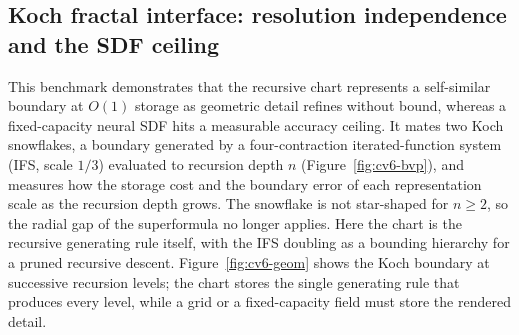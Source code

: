 \documentclass{svjour3}                 %
\begin{document}
\subsection{Koch fractal interface: resolution independence and the SDF ceiling}\label{sec:verif_cv6}

This benchmark demonstrates that the recursive chart represents a self-similar boundary at $O(1)$ storage as
geometric detail refines without bound, whereas a fixed-capacity neural SDF hits a measurable accuracy ceiling.
It mates two Koch snowflakes, a boundary generated by a four-contraction iterated-function system (IFS, scale
$1/3$) evaluated to recursion depth $n$ (Figure~\ref{fig:cv6-bvp}), and measures how the storage cost and the
boundary error of each representation scale as the recursion depth grows. The snowflake is not star-shaped for $n\ge
2$, so the radial gap of the superformula no longer applies. Here the chart is the recursive generating rule
itself, with the IFS doubling as a bounding hierarchy for a pruned recursive descent.
Figure~\ref{fig:cv6-geom} shows the Koch boundary at successive recursion levels; the chart stores the
single generating rule that produces every level, while a grid or a fixed-capacity field must store the
rendered detail.
\end{document}
